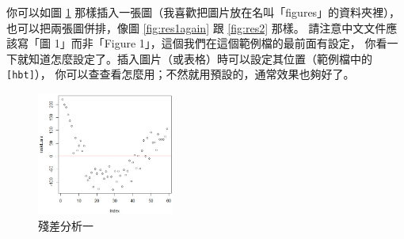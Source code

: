 \documentclass[12pt, a4paper]{article}
\begin{document}
你可以如圖 \ref{fig:res1} 那樣插入一張圖（我喜歡把圖片放在名叫「figures」的資料夾裡），
也可以把兩張圖併排，像圖 \ref{fig:res1again} 跟 \ref{fig:res2} 那樣。
請注意中文文件應該寫「圖 1」而非「Figure 1」，這個我們在這個範例檔的最前面有設定，
你看一下就知道怎麼設定了。插入圖片（或表格）時可以設定其位置（範例檔中的 \verb|[hbt]|），
你可以查查看怎麼用；不然就用預設的，通常效果也夠好了。

\begin{figure}[hbt]
\centering
\includegraphics[width=0.4\textwidth]{figures/res1}
\caption{殘差分析一}
\label{fig:res1}
\end{figure}
\end{document}
